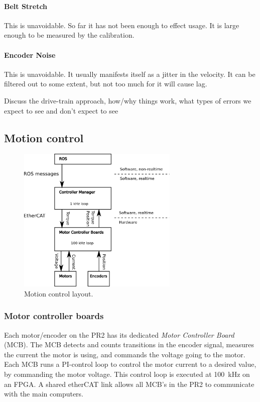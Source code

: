 \paragraph{Belt Stretch}
This is unavoidable.  So far it has not been enough to effect usage.
It is large enough to be measured by the calibration.
\paragraph{Encoder Noise}
This is unavoidable.  It usually manifests itself as a jitter in the
velocity.  It can be filtered out to some extent, but not too much for
it will cause lag.



Discuss the drive-train approach, how/why things work, what types of errors we expect to see and don't expect to see

\subsection{Motion control}


\begin{figure}[h]
\centering
\includegraphics[width=290px]{images/mechanism_control.png}
\caption{Motion control layout.}
\label{fig:motion_control}
\end{figure}


\subsubsection{Motor controller boards}
Each motor/encoder on the PR2 has its dedicated \emph{Motor Controller
  Board} (MCB). The MCB detects and counts transitions in the encoder
signal, measures the current the motor is using, and commands the
voltage going to the motor. Each MCB runs a PI-control loop to control
the motor current to a desired value, by commanding the motor
voltage. This control loop is executed at 100~kHz on an FPGA.  A
shared etherCAT link allows all MCB's in the PR2 to communicate with
the main computers.

